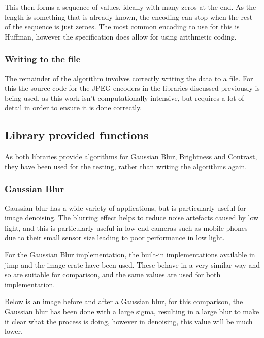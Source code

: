 \documentclass[12pt,a4paper]{article}
\begin{document}
This then forms a sequence of values, ideally with many zeros at the end. As the length is something that is already known, the encoding can stop when the rest of the sequence is just zeroes. The most common encoding to use for this is Huffman, however the specification does allow for using arithmetic coding.

\subsubsection{Writing to the file}

The remainder of the algorithm involves correctly writing the data to a file. For this the source code for the JPEG encoders in the libraries discussed previously is being used, as this work isn't computationally intensive, but requires a lot of detail in order to ensure it is done correctly.

\subsection{Library provided functions}

As both libraries provide algorithms for Gaussian Blur, Brightness and Contrast, they have been used for the testing, rather than writing the algorithms again.

\subsubsection{Gaussian Blur}

Gaussian blur has a wide variety of applications, but is particularly useful for image denoising. The blurring effect helps to reduce noise artefacts caused by low light, and this is particularly useful in low end cameras such as mobile phones due to their small sensor size leading to poor performance in low light.


For the Gaussian Blur implementation, the built-in implementations available in jimp and the image crate have been used. These behave in a very similar way and so are suitable for comparison, and the same values are used for both implementation.

Below is an image before and after a Gaussian blur, for this comparison, the Gaussian blur has been done with a large sigma, resulting in a large blur to make it clear what the process is doing, however in denoising, this value will be much lower.
\end{document}

